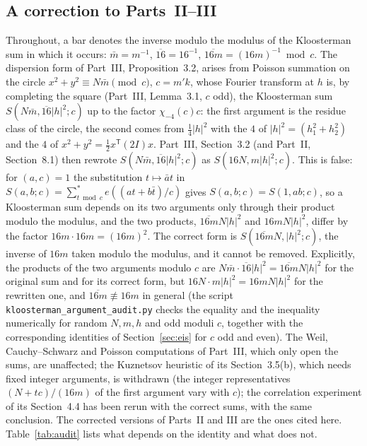 \documentclass[11pt]{amsart}
\theoremstyle{remark}
\begin{document}
\subsection{A correction to Parts~II--III}\label{subsec:correction}
Throughout, a bar denotes the inverse modulo the modulus of the Kloosterman sum in which it occurs: $\bar m=m^{-1}$, $\overline{16}=16^{-1}$, $\overline{16m}=(16m)^{-1}\bmod c$. The dispersion form of Part~III, Proposition~3.2, arises from Poisson summation on the circle $x^2+y^2\equiv N\bar m\pmod c$, $c=m'k$, whose Fourier transform at $h$ is, by completing the square (Part~III, Lemma~3.1, $c$ odd), the Kloosterman sum $S(N\bar m,\overline{16}|h|^2;c)$ up to the factor $\chi_{-4}(c)c$: the first argument is the residue class of the circle, the second comes from $\frac14|h|^2$ with the $4$ of $|h|^2=(h_1^2+h_2^2)$ and the $4$ of $x^2+y^2=\frac12x^{\mathsf T}(2I)x$. Part~III, Section~3.2 (and Part~II, Section~8.1) then rewrote $S(N\bar m,\overline{16}|h|^2;c)$ as $S(16N,m|h|^2;c)$. This is false: for $(a,c)=1$ the substitution $t\mapsto\bar at$ in $S(a,b;c)=\sum_{t\bmod c}^{*}e((at+b\bar t)/c)$ gives $S(a,b;c)=S(1,ab;c)$, so a Kloosterman sum depends on its two arguments only through their product modulo the modulus, and the two products, $\overline{16m}N|h|^2$ and $16mN|h|^2$, differ by the factor $16m\cdot16m=(16m)^2$. The correct form is $S(\overline{16m}N,|h|^2;c)$, the inverse of $16m$ taken modulo the modulus, and it cannot be removed. Explicitly, the products of the two arguments modulo $c$ are $N\bar m\cdot\overline{16}|h|^2=\overline{16m}N|h|^2$ for the original sum and for its correct form, but $16N\cdot m|h|^2=16mN|h|^2$ for the rewritten one, and $\overline{16m}\not\equiv16m$ in general (the script \texttt{kloosterman\_argument\_audit.py} checks the equality and the inequality numerically for random $N,m,h$ and odd moduli $c$, together with the corresponding identities of Section~\ref{sec:eis} for $c$ odd and even). The Weil, Cauchy--Schwarz and Poisson computations of Part~III, which only open the sums, are unaffected; the Kuznetsov heuristic of its Section~3.5(b), which needs fixed integer arguments, is withdrawn (the integer representatives $(N+tc)/(16m)$ of the first argument vary with $c$); the correlation experiment of its Section~4.4 has been rerun with the correct sums, with the same conclusion. The corrected versions of Parts~II and III are the ones cited here. Table~\ref{tab:audit} lists what depends on the identity and what does not.
\end{document}
